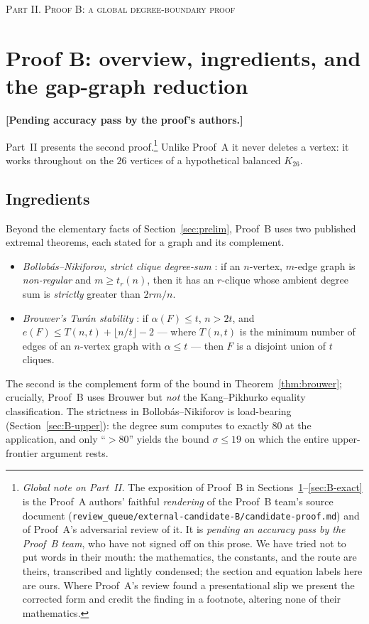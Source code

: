 \documentclass[11pt,reqno]{amsart}
\theoremstyle{definition}
\theoremstyle{remark}
\newcommand{\pendingB}{%
  \par\nobreak\smallskip\noindent
  \textbf{[Pending accuracy pass by the proof's authors.]}\par\smallskip}
\newcommand{\ppart}[1]{%
  \bigskip\par\begin{center}\normalfont\scshape\large #1\end{center}%
  \nopagebreak\medskip}
\begin{document}
\ppart{Part II. Proof B: a global degree-boundary proof}

\section{Proof B: overview, ingredients, and the gap-graph reduction}\label{sec:B-overview}
\pendingB

Part~II presents the second proof.\footnote{\emph{Global note on Part~II.} The exposition
of Proof~B in Sections~\ref{sec:B-overview}--\ref{sec:B-exact} is the Proof~A authors'
faithful \emph{rendering} of the Proof~B team's source document
(\texttt{review\_queue/external-candidate-B/candidate-proof.md}) and of Proof~A's
adversarial review of it. It is \emph{pending an accuracy pass by the Proof~B team}, who
have not signed off on this prose. We have tried not to put words in their mouth: the
mathematics, the constants, and the route are theirs, transcribed and lightly condensed;
the section and equation labels here are ours. Where Proof~A's review found a
presentational slip we present the corrected form and credit the finding in a footnote,
altering none of their mathematics.} Unlike Proof~A it never deletes a vertex: it works
throughout on the $26$ vertices of a hypothetical balanced $K_{26}$.

\subsection{Ingredients}
Beyond the elementary facts of Section~\ref{sec:prelim}, Proof~B uses two published
extremal theorems, each stated for a graph and its complement.
\begin{itemize}[nosep]
\item \emph{Bollob\'as--Nikiforov, strict clique degree-sum} \cite{BN05}: if an
$n$-vertex, $m$-edge graph is \emph{non-regular} and $m\ge t_r(n)$, then it has an
$r$-clique whose ambient degree sum is \emph{strictly} greater than $2rm/n$.
\item \emph{Brouwer's Tur\'an stability} \cite{Brouwer81}: if $\alpha(F)\le t$, $n>2t$,
and $e(F)\le T(n,t)+\lfloor n/t\rfloor-2$ --- where $T(n,t)$ is the minimum number of
edges of an $n$-vertex graph with $\alpha\le t$ --- then $F$ is a disjoint union of $t$
cliques.
\end{itemize}
The second is the complement form of the bound in Theorem~\ref{thm:brouwer}; crucially,
Proof~B uses Brouwer but \emph{not} the Kang--Pikhurko equality classification. The
strictness in Bollob\'as--Nikiforov is load-bearing (Section~\ref{sec:B-upper}): the
degree sum computes to exactly $80$ at the application, and only ``$>80$'' yields the
bound $\sigma\le 19$ on which the entire upper-frontier argument rests.
\end{document}
